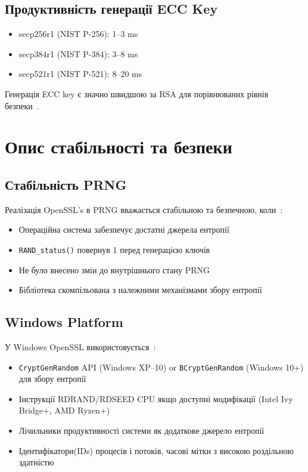 \subsection{Продуктивність генерації ECC Key}
\begin{itemize}
    \item secp256r1 (NIST P-256): 1--3 ms
    \item secp384r1 (NIST P-384): 3--8 ms
    \item secp521r1 (NIST P-521): 8--20 ms
\end{itemize}

Генерація ECC key є значно швидшою за RSA для порівнюваних рівнів безпеки~\cite{hankerson2006guide}.

\section{Опис стабільності та безпеки}

\subsection{Стабільність PRNG}
Реалізація OpenSSL's в PRNG вважається стабільною та безпечною, коли~\cite{viega2002network}:
\begin{itemize}
    \item Операційна система забезпечує достатні джерела ентропії
    \item \texttt{RAND\_status()} повернув 1 перед генерацією ключів
    \item Не було внесено змін до внутрішнього стану PRNG
    \item Бібліотека скомпільована з належними механізмами збору ентропії
\end{itemize}

\subsection{Windows Platform}
У Windows OpenSSL використовується~\cite{microsoft_crypto}:
\begin{itemize}
    \item \texttt{CryptGenRandom} API (Windows XP--10) or \texttt{BCryptGenRandom} (Windows 10+) для збору ентропії
    \item Інструкції RDRAND/RDSEED CPU якщо доступні модифікації (Intel Ivy Bridge+, AMD Ryzen+)
    \item Лічильники продуктивності системи як додаткове джерело ентропії
    \item Ідентифікатори(IDs) процесів і потоків, часові мітки з високою роздільною здатністю
\end{itemize}

